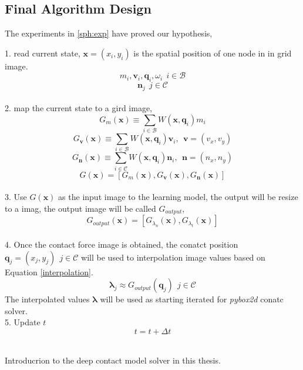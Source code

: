 \subsection{Final Algorithm Design}
    The experiments in \ref{sph:exp} have proved our hypothesis, \textbf{}\\
    \begin{algorithm}
        {
            1. read current state, $\mathbf{x}=(x_i, y_i)$ is the spatial position of one node in in grid image.
                $$m_i, \pmb{v}_i, \pmb{q}_i, \omega_{i}~~i\in\mathcal{B}$$
                $$\pmb{n}_j~~j\in\mathcal{C}$$ \\
            2. map the current state to a gird image,
                $$G_{m}(\mathbf{x}) \equiv \sum_{i\in \mathcal{B}}W(\mathbf{x}, \pmb{q}_{i})m_i$$ 
                $$G_{\pmb{v}}(\mathbf{x}) \equiv \sum_{i\in \mathcal{B}}W(\mathbf{x}, \pmb{q}_{i})\pmb{v}_i,~~\pmb{v}=(v_x, v_y)$$
                $$G_{\pmb{n}}(\mathbf{x}) \equiv \sum_{i\in\mathcal{C}}W(\mathbf{x}, \pmb{q}_{i})\pmb{n}_{i},~~\pmb{n}=(n_x,n_y)$$
                $$G(\mathbf{x}) = [G_{m}(\mathbf{x}), G_{\pmb{v}}(\mathbf{x}), G_{\pmb{n}}(\mathbf{x})]$$ \\
            3. Use $G(\mathbf{x})$ as the input image to the learning model, the output will be resize to a imag, the output image will be called $G_{output}$,
                $$G_{output}(\mathbf{x}) = [G_{\lambda_{n}}(\mathbf{x}), G_{{\lambda}_{t}}(\mathbf{x})]$$ \\
            4. Once the contact force image is obtained,  the conatct position $\pmb{q}_{j} = (x_{j}, y_{j})~~j\in\mathcal{C}$  will be used to interpolation image values based on Equation \ref{interpolation}.
                $$\pmb{\lambda}_j \approx G_{output}(\pmb{q}_j)~~j\in\mathcal{C}$$ 
            The interpolated values $\pmb{\lambda}$ will be used as starting iterated for \textit{pybox2d} conatc solver. \\
            5. Update $t$
                $$t = t + \Delta t$$ \\
        }
        \caption{Introducrion to the deep contact model solver in this thesis.}
    \end{algorithm}

